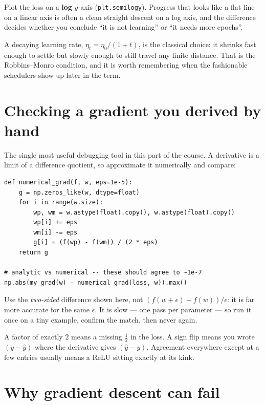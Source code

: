 \documentclass[11pt]{article}
\begin{document}
Plot the loss on a \textbf{log} $y$-axis (\texttt{plt.semilogy}). Progress that
looks like a flat line on a linear axis is often a clean straight descent on a
log axis, and the difference decides whether you conclude ``it is not learning''
or ``it needs more epochs''.

A decaying learning rate, $\eta_t = \eta_0/(1+t)$, is the classical choice: it
shrinks fast enough to settle but slowly enough to still travel any finite
distance. That is the Robbins--Monro condition, and it is worth remembering
when the fashionable schedulers show up later in the term.

\section{Checking a gradient you derived by hand}

The single most useful debugging tool in this part of the course. A derivative
is a limit of a difference quotient, so approximate it numerically and compare:

\begin{lstlisting}
def numerical_grad(f, w, eps=1e-5):
    g = np.zeros_like(w, dtype=float)
    for i in range(w.size):
        wp, wm = w.astype(float).copy(), w.astype(float).copy()
        wp[i] += eps
        wm[i] -= eps
        g[i] = (f(wp) - f(wm)) / (2 * eps)
    return g

# analytic vs numerical -- these should agree to ~1e-7
np.abs(my_grad(w) - numerical_grad(loss, w)).max()
\end{lstlisting}

Use the \emph{two-sided} difference shown here, not $(f(w+\epsilon)-f(w))/\epsilon$:
it is far more accurate for the same $\epsilon$. It is slow --- one pass per
parameter --- so run it once on a tiny example, confirm the match, then never
again.

\begin{keybox}
 A factor of exactly $2$ means a missing
$\tfrac{1}{2}$ in the loss. A sign flip means you wrote $(y - \hat{y})$ where
the derivative gives $(\hat{y} - y)$. Agreement everywhere except at a few
entries usually means a ReLU sitting exactly at its kink.
\end{keybox}

\section{Why gradient descent can fail}
\end{document}
